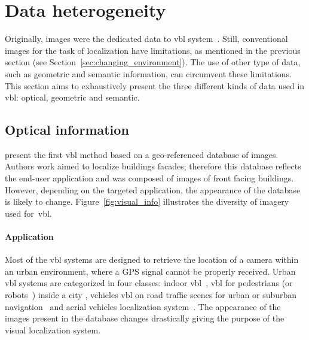 \section{Data heterogeneity}
\label{sec:application}	



	Originally, images were the dedicated data to \ac{vbl} system~\citep{Robertson2004}. Still, conventional images for the task of localization have limitations, as mentioned in the previous section (see Section~\ref{sec:changing_environment}). The use of other type of data, such as geometric and semantic information, can circumvent these limitations. This section aims to exhaustively present the three different kinds of data used in \ac{vbl}: optical, geometric and semantic.

	\subsection{Optical information}
		\label{subsec:visual_info}
		\citet{Robertson2004} present the first \ac{vbl} method based on a geo-referenced database of images. Authors work aimed to localize buildings facades; therefore this database reflects the end-user application and was composed of images of front facing buildings. However, depending on the targeted application, the appearance of the database is likely to change. Figure~\ref{fig:visual_info} illustrates the diversity of imagery used for~\ac{vbl}.
		
		\paragraph{Application}
			Most of the \ac{vbl} systems are designed to retrieve the location of a camera within an urban environment, where a GPS signal cannot be properly received. Urban \ac{vbl} systems are categorized in four classes: indoor \ac{vbl}~\citep{Liang2013}, \ac{vbl} for pedestrians (or robots~\citep{Garcia-Fidalgo2015}) inside a city \citep{Robertson2004,Schindler2007,Chen2011,Zhang2006}, vehicles \ac{vbl} on road traffic scenes for urban or suburban navigation~\citep{McManus2014,Milford2015,Qu2016,Brubaker2016} and aerial vehicles localization system~\citep{Wan2016}. The appearance of the images present in the database changes drastically giving the purpose of the visual localization system.
		
